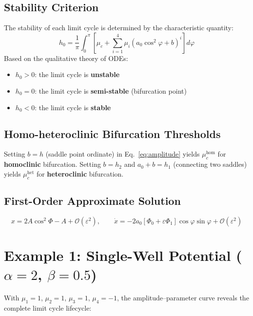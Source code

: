 \documentclass[11pt,a4paper]{article}
\begin{document}
\subsection{Stability Criterion}

The stability of each limit cycle is determined by the characteristic quantity:
\begin{equation}
\boxed{h_0 = \frac{1}{\pi}\int_0^\pi \left[\mu_c + \sum_{i=1}^{4}\mu_i(a_0\cos^2\varphi + b)^i\right]d\varphi}
\label{eq:stability}
\end{equation}
Based on the qualitative theory of ODEs:
\begin{itemize}[leftmargin=2em]
\item $h_0 > 0$: the limit cycle is \textbf{unstable}
\item $h_0 = 0$: the limit cycle is \textbf{semi-stable} (bifurcation point)
\item $h_0 < 0$: the limit cycle is \textbf{stable}
\end{itemize}

\subsection{Homo-heteroclinic Bifurcation Thresholds}

Setting $b = h$ (saddle point ordinate) in Eq.~\eqref{eq:amplitude} yields $\mu_c^{\mathrm{hom}}$ for \textbf{homoclinic} bifurcation. Setting $b = h_2$ and $a_0 + b = h_1$ (connecting two saddles) yields $\mu_c^{\mathrm{het}}$ for \textbf{heteroclinic} bifurcation.

\subsection{First-Order Approximate Solution}

\begin{equation}
x = 2A\cos^2\Phi - A + \mathcal{O}(\varepsilon^2), \qquad \dot{x} = -2a_0[\Phi_0 + \varepsilon\Phi_1]\cos\varphi\sin\varphi + \mathcal{O}(\varepsilon^2)
\end{equation}

\section{Example 1: Single-Well Potential ($\alpha=2$, $\beta=0.5$)}

With $\mu_1=1$, $\mu_2=1$, $\mu_3=1$, $\mu_4=-1$, the amplitude--parameter curve reveals the complete limit cycle lifecycle:
\end{document}
